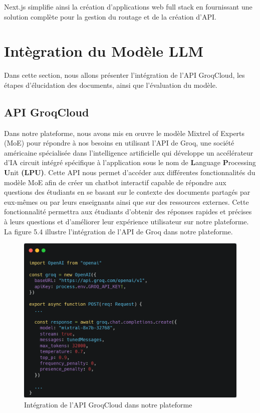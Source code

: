 \noindent Next.js simplifie ainsi la création d'applications web full stack en fournissant une solution complète pour la gestion du routage et de la création d'API.


\section{Intègration du Modèle LLM}
Dans cette section, nous allons présenter l'intégration de l'API GroqCloud, les étapes d'élucidation des documents, ainsi que l'évaluation du modèle.
\subsection{API GroqCloud}
Dans notre plateforme, nous avons mis en œuvre le modèle Mixtrel of Experts (MoE) pour répondre à nos besoins en utilisant l'API de Groq, une société américaine spécialisée dans l'intelligence artificielle qui développe un accélérateur d'IA circuit intégré spécifique à l'application sous le nom de \textbf{L}anguage \textbf{P}rocessing \textbf{U}nit \textbf{(LPU)}. Cette API nous permet d'accéder aux différentes fonctionnalités du modèle MoE afin de créer un chatbot interactif capable de répondre aux questions des étudiants en se basant sur le contexte des documents partagés par eux-mêmes ou par leurs enseignants ainsi que sur des ressources externes. Cette fonctionnalité permettra aux étudiants d'obtenir des réponses rapides et précises à leurs questions et d'améliorer leur expérience utilisateur sur notre plateforme.\\
La figure 5.4 illustre l'intégration de l'API de Groq dans notre plateforme.
\begin{figure}[H]
    \centering
    \includegraphics[width=\textwidth]{images/chp5/fig4.png}
    \caption{Intégration de l'API GroqCloud dans notre plateforme}
    \label{fig:Integration de l'API GroqCloud dans notre plateforme}    
\end{figure}
